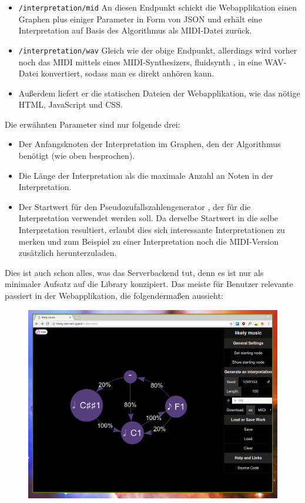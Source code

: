\documentclass[a4paper,twocolumn]{article}
\begin{document}
\begin{itemize}
  \item \lstinline[basicstyle=\ttfamily]|/interpretation/mid| An diesen Endpunkt
    schickt die Webapplikation einen Graphen plus einiger Parameter in Form von JSON
    \cite{json} und erhält eine Interpretation auf Basis des Algorithmus als
    MIDI-Datei zurück.
  \item \lstinline[basicstyle=\ttfamily]|/interpretation/wav| Gleich wie der
    obige Endpunkt, allerdings wird vorher
    noch das MIDI mittels eines MIDI-Synthesizers, fluidsynth \cite{fluidsynth},
    in eine WAV-Datei konvertiert, sodass man es direkt anhören kann.
  \item Außerdem liefert er die statischen Dateien der Webapplikation, wie das
    nötige HTML, JavaScript und CSS.
\end{itemize}

Die erwähnten Parameter sind nur folgende drei:

\begin{itemize}
  \item Der Anfangsknoten der Interpretation im Graphen,
    den der Algorithmus benötigt (wie oben besprochen).
  \item Die Länge der Interpretation als die maximale Anzahl an Noten in der
    Interpretation.
  \item Der Startwert für den Pseudozufallszahlengenerator
    \cite{wikipedia_prng}, der für die Interpretation verwendet werden soll.
    Da derselbe Startwert in die selbe Interpretation resultiert, erlaubt dies
    sich interessante Interpretationen zu merken und zum Beispiel zu einer
    Interpretation noch die MIDI-Version zusätzlich herunterzuladen.
\end{itemize}

Dies ist auch schon alles, was das Serverbackend tut, denn es ist nur als
minimaler Aufsatz auf die Library konzipiert. Das meiste für Benutzer relevante
passiert in der Webapplikation, die folgendermaßen aussieht:

\begin{figure}[h]
  \includegraphics[width=.5\textwidth]{screenshots/start.png}
\end{figure}
\end{document}
